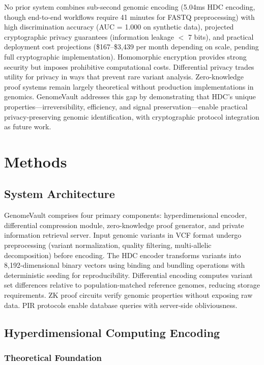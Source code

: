 \documentclass[11pt,letterpaper]{article}
\begin{document}
No prior system combines sub-second genomic encoding (5.04ms HDC encoding, though end-to-end workflows require 41 minutes for FASTQ preprocessing) with high discrimination accuracy (AUC = 1.000 on synthetic data), projected cryptographic privacy guarantees (information leakage $<$ 7 bits), and practical deployment cost projections (\$167--\$3,439 per month depending on scale, pending full cryptographic implementation). Homomorphic encryption provides strong security but imposes prohibitive computational costs. Differential privacy trades utility for privacy in ways that prevent rare variant analysis. Zero-knowledge proof systems remain largely theoretical without production implementations in genomics. GenomeVault addresses this gap by demonstrating that HDC's unique properties---irreversibility, efficiency, and signal preservation---enable practical privacy-preserving genomic identification, with cryptographic protocol integration as future work.

\section{Methods}

\subsection{System Architecture}

GenomeVault comprises four primary components: hyperdimensional encoder, differential compression module, zero-knowledge proof generator, and private information retrieval server. Input genomic variants in VCF format undergo preprocessing (variant normalization, quality filtering, multi-allelic decomposition) before encoding. The HDC encoder transforms variants into 8,192-dimensional binary vectors using binding and bundling operations with deterministic seeding for reproducibility. Differential encoding computes variant set differences relative to population-matched reference genomes, reducing storage requirements. ZK proof circuits verify genomic properties without exposing raw data. PIR protocols enable database queries with server-side obliviousness.

\subsection{Hyperdimensional Computing Encoding}

\subsubsection{Theoretical Foundation}
\end{document}
